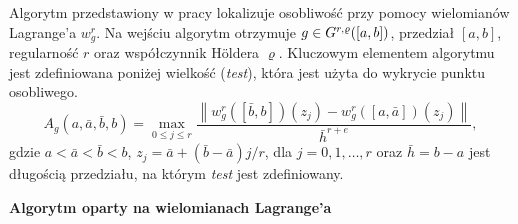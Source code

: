 \documentclass[oik, pdftex, robocza, man]{mgrwms}
\begin{document}
    Algorytm przedstawiony w pracy \cite{CoDF} lokalizuje osobliwość przy pomocy wielomianów Lagrange'a $w_{g}^{r}$. Na wejściu algorytm otrzymuje $g \in G^{r,\varrho}([a,b])$, przedział $[a,b]$, regularność $r$ oraz współczynnik Höldera $\varrho$. Kluczowym elementem algorytmu jest zdefiniowana poniżej wielkość (\textit{test}), która jest użyta do wykrycie punktu osobliwego.
    \begin{equation}
        \label{eqn:test}
        A_{g}(a, \bar{a}, \bar{b}, b)=\max _{0 \leq j \leq r} \frac{\left\|w_{g}^{r}([\bar{b}, b])\left(z_{j}\right)-w_{g}^{r}([a, \bar{a}])\left(z_{j}\right)\right\|}{\bar{h}^{r+e}},
    \end{equation}
    gdzie $a<\bar{a}<\bar{b}<b$, $z_{j} = \bar{a} + (\bar{b} - \bar{a})j/r$, dla $j=0,1,\dots,r$ oraz $\bar{h} = b - a$ jest długością przedziału, na którym \textit{test} jest zdefiniowany.

    \newpage
    \textbf{Algorytm oparty na wielomianach Lagrange'a}
\end{document}
